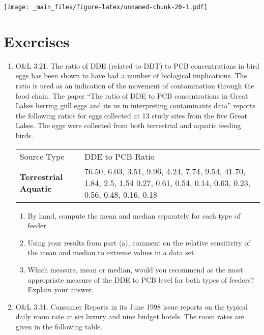 \documentclass[]{book}
\providecommand{\tightlist}{%
  \setlength{\itemsep}{0pt}\setlength{\parskip}{0pt}}
\begin{document}
\texttt{[image: \_main\_files/figure-latex/unnamed-chunk-20-1.pdf]}

\section{Exercises}\label{exercises}

\begin{enumerate}
\def\labelenumi{\arabic{enumi}.}
\item
  O\&L 3.21. The ratio of DDE (related to DDT) to PCB concentrations in
  bird eggs has been shown to have had a number of biological
  implications. The ratio is used as an indication of the movement of
  contamination through the food chain. The paper ``The ratio of DDE to
  PCB concentrations in Great Lakes herring gull eggs and its us in
  interpreting contaminants data'' reports the following ratios for eggs
  collected at 13 study sites from the five Great Lakes. The eggs were
  collected from both terrestrial and aquatic feeding birds.

  \begin{longtable}[]{@{}ll@{}}
  \toprule
  \begin{minipage}[t]{0.20\columnwidth}\raggedright\strut
  Source Type\strut
  \end{minipage} &
  \begin{minipage}[t]{0.74\columnwidth}\raggedright\strut
  DDE to PCB Ratio\strut
  \end{minipage}\tabularnewline
  \begin{minipage}[t]{0.20\columnwidth}\raggedright\strut
  \textbf{Terrestrial} \textbf{Aquatic}\strut
  \end{minipage} &
  \begin{minipage}[t]{0.74\columnwidth}\raggedright\strut
  76.50, 6.03, 3.51, 9.96, 4.24, 7.74, 9.54, 41.70, 1.84, 2.5, 1.54
  0.27, 0.61, 0.54, 0.14, 0.63, 0.23, 0.56, 0.48, 0.16, 0.18\strut
  \end{minipage}\tabularnewline
  \bottomrule
  \end{longtable}

  \begin{enumerate}
  \def\labelenumii{\alph{enumii})}
  \tightlist
  \item
    By hand, compute the mean and median separately for each type of
    feeder.
  \item
    Using your results from part (a), comment on the relative
    sensitivity of the mean and median to extreme values in a data set.
  \item
    Which measure, mean or median, would you recommend as the most
    appropriate measure of the DDE to PCB level for both types of
    feeders? Explain your answer.
  \end{enumerate}
\item
  O\&L 3.31. Consumer Reports in its June 1998 issue reports on the
  typical daily room rate at six luxury and nine budget hotels. The room
  rates are given in the following table.


\end{enumerate}
\end{document}
